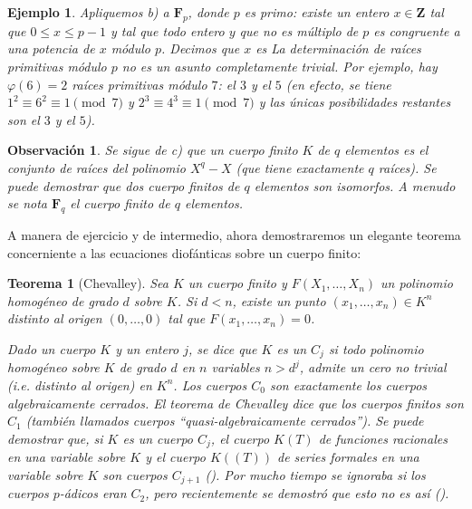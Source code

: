 \documentclass[bibtotoc,leqno,spanish]{amsbook}
\let\emph\relax %
\newcommand{\ZZ}{\mathbf{Z}}
\newcommand{\FF}{\mathbf{F}}
\numberwithin{equation}{section}
\newenvironment{comm}%
	{\begin{list}{}{\setlength{\leftmargin}{2\parindent}\setlength{\topsep}{\baselineskip}}\item\itshape}
	{\end{list}}
\theoremstyle{note}
\theoremstyle{note}
\newtheorem{theorem}{Teorema}
\theoremstyle{rem}
\newtheorem*{example*}{Ejemplo}
\newtheorem*{remark*}{Observaci\'on}
\numberwithin{theorem}{section}
\numberwithin{proposition}{section}
\numberwithin{definition}{section}
\numberwithin{lemma}{section}
\numberwithin{corollary}{section}
\numberwithin{example}{section}
\numberwithin{footnote}{section}%
\begin{document}
\begin{example*}
Apliquemos b) a $\FF_{p}$, donde $p$ es primo: existe un entero $x\in\ZZ$ tal que $0\leq x\leq p-1$ y tal
que todo entero $y$ que no es m\'ultiplo de $p$ es congruente a una potencia de $x$ m\'odulo $p$. Decimos
que $x$ es \emph{una ra\'iz primitiva m\'odulo $p$.} La determinaci\'on de ra\'ices primitivas m\'odulo
$p$ no es un asunto completamente trivial. Por ejemplo, hay $\varphi(6) = 2$ ra\'ices primitivas m\'odulo $7$:
el $3$ y el $5$ (en efecto, se tiene $1^{2}\equiv 6^{2}\equiv 1\pmod 7$ y $2^{3}\equiv 4^{3}\equiv 1\pmod 7$
y las \'unicas posibilidades restantes son el $3$ y el $5$).
\end{example*}

\begin{remark*}
Se sigue de c) que un cuerpo finito $K$ de $q$ elementos es el conjunto de ra\'ices del polinomio $X^{q}-X$
(que tiene exactamente $q$ ra\'ices). Se puede demostrar que dos cuerpo finitos de $q$ elementos son isomorfos.
A menudo se nota $\FF_{q}$ el cuerpo finito de $q$ elementos.
\end{remark*}

A manera de ejercicio y de intermedio, ahora demostraremos un elegante teorema concerniente a las
ecuaciones diof\'anticas sobre un cuerpo finito:

\begin{theorem}[Chevalley]\label{teo1.7.2}
Sea $K$ un cuerpo finito y $F(X_{1},\dots,X_{n})$ un polinomio homog\'eneo de grado $d$ sobre $K$.
Si $d < n$, existe un punto $(x_{1},\dots,x_{n})\in K^{n}$ distinto al origen $(0,\dots,0)$ tal que
$F(x_{1},\dots,x_{n}) = 0$.
\end{theorem}

\begin{comm}
Dado un cuerpo $K$ y un entero $j$, se dice que $K$ es un \emph{cuerpo} $C_{j}$ si todo polinomio
homog\'eneo sobre $K$ de grado $d$ en $n$ variables \emph{tal que} $n > d^{j}$, admite un cero no
trivial (i.e. distinto al origen) en $K^{n}$. Los cuerpos $C_{0}$ son exactamente los cuerpos algebraicamente
cerrados. El teorema de Chevalley dice que los cuerpos finitos son $C_{1}$ (tambi\'en llamados
cuerpos ``quasi-algebraicamente cerrados''). Se puede demostrar que, si $K$ es un cuerpo $C_{j}$, el
cuerpo $K(T)$ de funciones racionales en una variable sobre $K$ y el cuerpo $K((T))$ de series formales
en una variable sobre $K$ son cuerpos $C_{j+1}$ (\cite{Lang}). Por mucho tiempo se ignoraba si los
cuerpos $p$-\'adicos eran $C_{2}$, pero recientemente se demostr\'o que esto no es as\'i (\cite{Terjanian}).
\end{comm}
\end{document}
